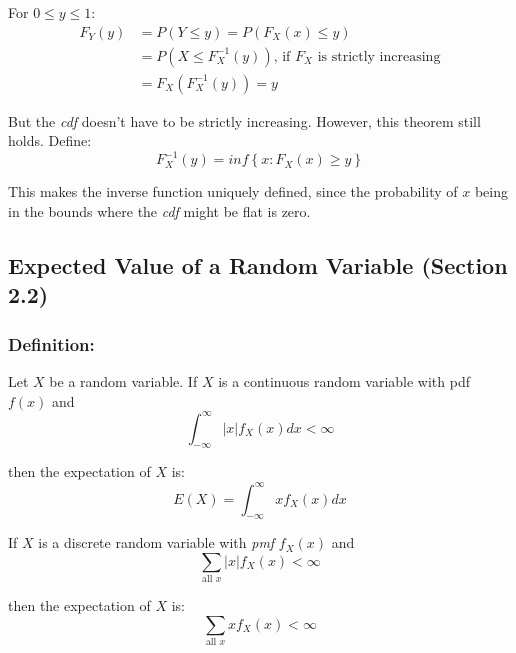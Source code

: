 \documentclass{article}
\begin{document}
    For $0 \leq y \leq 1$:
    \begin{equation*}
    \begin{split}
        F_Y(y) &= P(Y \leq y) = P(F_X(x) \leq y)\\
                &= P(X \leq F_X^{-1} (y)) \text{, if $F_X$ is strictly increasing}\\
                &= F_X(F_X^{-1}(y)) = y
    \end{split}
    \end{equation*}

    But the \textit{cdf} doesn't have to be strictly increasing. However, this theorem still holds. Define:
    \begin{equation*}
        F_X^{-1}(y) = inf \left\{ x: F_X(x) \geq y \right\}
    \end{equation*}
    
    This makes the inverse function uniquely defined, since the probability of $x$ being in the bounds where the \textit{cdf} might be flat is zero.
    
    \subsection{Expected Value of a Random Variable (Section 2.2)}
    \subsubsection*{Definition:}
    Let $X$ be a random variable. If $X$ is a continuous random variable with pdf $f(x)$ and
    \begin{equation*}
        \int_{-\infty}^\infty |x| f_X(x) dx < \infty
    \end{equation*}
    
    then the expectation of $X$ is:
    \begin{equation*}
        E(X) = \int_{-\infty}^\infty x f_X(x) dx
    \end{equation*}
    
    \noindent If $X$ is a discrete random variable with \textit{pmf} $f_X(x)$ and
    \begin{equation*}
        \sum_{\text{all } x} |x|f_X(x) < \infty
    \end{equation*}
    
    then the expectation of $X$ is:
    \begin{equation*}
        \sum_{\text{all } x} xf_X(x) < \infty
    \end{equation*}
    
\end{document}
